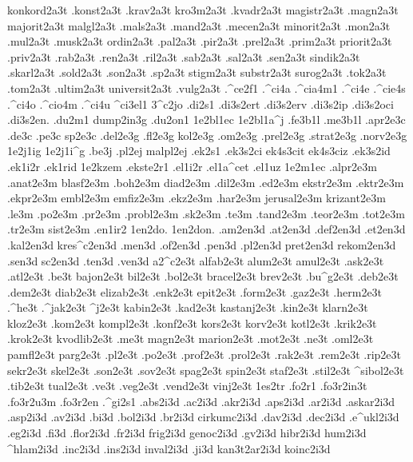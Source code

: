 {konkord2a3t .konst2a3t .krav2a3t kro3m2a3t .kvadr2a3t magistr2a3t .magn2a3t
majorit2a3t malgl2a3t .mals2a3t .mand2a3t .mecen2a3t minorit2a3t .mon2a3t
.mul2a3t .musk2a3t ordin2a3t .pal2a3t .pir2a3t .prel2a3t .prim2a3t
priorit2a3t .priv2a3t .rab2a3t .ren2a3t .ril2a3t .sab2a3t .sal2a3t
.sen2a3t sindik2a3t .skarl2a3t .sold2a3t .son2a3t .sp2a3t stigm2a3t
substr2a3t surog2a3t .tok2a3t .tom2a3t .ultim2a3t universit2a3t .vulg2a3t
.^ce2f1
.^ci4a .^cia4m1 .^ci4e .^cie4s .^ci4o .^cio4m .^ci4u
^ci3el1
3^c2jo
.di2s1
.di3s2ert .di3s2erv .di3s2ip .di3s2oci
 .di3s2en.
.du2m1
dump2in3g
.du2on1
  1e2bl1ec 1e2bl1a^j
.fe3b1l .me3b1l
.apr2e3c .de3c .pe3c sp2e3c
 
.del2e3g .fl2e3g kol2e3g .om2e3g .prel2e3g .strat2e3g .norv2e3g
 1e2j1ig 1e2j1i^g
.be3j .pl2ej malpl2ej
.ek2s1 .ek3s2ci ek4s3cit ek4s3ciz .ek3s2id .ek1i2r .ek1rid
1e2kzem
.ekste2r1
 
.el1i2r .el1a^cet .el1uz
  1e2m1ec
.alpr2e3m .anat2e3m blasf2e3m .boh2e3m diad2e3m .dil2e3m .ed2e3m ekstr2e3m
.ektr2e3m .ekpr2e3m embl2e3m emfiz2e3m .ekz2e3m .har2e3m jerusal2e3m
krizant2e3m .le3m .po2e3m .pr2e3m .probl2e3m .sk2e3m .te3m .tand2e3m .teor2e3m
.tot2e3m .tr2e3m sist2e3m
.en1ir2
  1en2do. 1en2don.
.am2en3d .at2en3d .def2en3d .et2en3d .kal2en3d kres^c2en3d .men3d .of2en3d
.pen3d .pl2en3d pret2en3d rekom2en3d .sen3d sc2en3d .ten3d .ven3d
 
a2^c2e3t alfab2e3t alum2e3t amul2e3t .ask2e3t .atl2e3t .be3t
bajon2e3t bil2e3t .bol2e3t bracel2e3t brev2e3t .bu^g2e3t .deb2e3t .dem2e3t
diab2e3t elizab2e3t .enk2e3t epit2e3t .form2e3t .gaz2e3t .herm2e3t .^he3t
.^jak2e3t ^j2e3t kabin2e3t .kad2e3t kastanj2e3t .kin2e3t klarn2e3t
kloz2e3t .kom2e3t kompl2e3t .konf2e3t kors2e3t korv2e3t kotl2e3t .krik2e3t
.krok2e3t kvodlib2e3t .me3t magn2e3t marion2e3t .mot2e3t .ne3t .oml2e3t
pamfl2e3t parg2e3t .pl2e3t .po2e3t .prof2e3t .prol2e3t .rak2e3t .rem2e3t
.rip2e3t sekr2e3t skel2e3t .son2e3t .sov2e3t spag2e3t spin2e3t staf2e3t
.stil2e3t ^sibol2e3t .tib2e3t tual2e3t .ve3t .veg2e3t .vend2e3t vinj2e3t
%
1es2tr
.fo2r1
.fo3r2in3t .fo3r2u3m
 .fo3r2en 
.^gi2s1
.abs2i3d .ac2i3d .akr2i3d .aps2i3d .ar2i3d .askar2i3d .asp2i3d .av2i3d
.bi3d .bol2i3d .br2i3d cirkumc2i3d .dav2i3d .dec2i3d .e^ukl2i3d
.eg2i3d .fi3d .flor2i3d .fr2i3d frig2i3d genoc2i3d .gv2i3d hibr2i3d
hum2i3d ^hlam2i3d .inc2i3d .ins2i3d inval2i3d .ji3d kan3t2ar2i3d koinc2i3d
}
